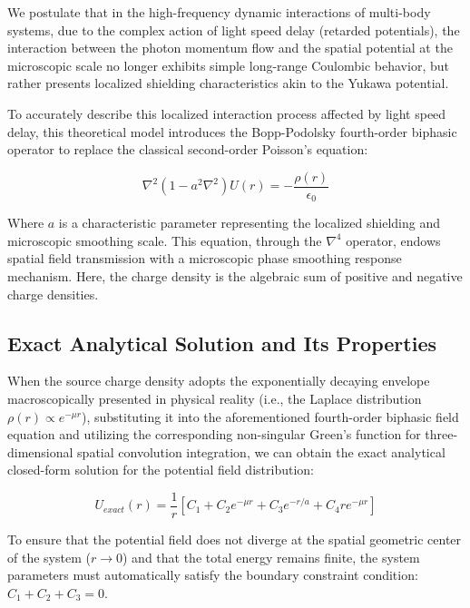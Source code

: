 \documentclass[12pt, a4paper]{article}
\begin{document}
We postulate that in the high-frequency dynamic interactions of multi-body systems, due to the complex action of light speed delay (retarded potentials), the interaction between the photon momentum flow and the spatial potential at the microscopic scale no longer exhibits simple long-range Coulombic behavior, but rather presents localized shielding characteristics akin to the Yukawa potential.

To accurately describe this localized interaction process affected by light speed delay, this theoretical model introduces the Bopp-Podolsky fourth-order biphasic operator to replace the classical second-order Poisson's equation:

\begin{equation}
\nabla^2 (1 - a^2 \nabla^2) U(r) = - \frac{\rho(r)}{\epsilon_0} 
\end{equation}

Where $a$ is a characteristic parameter representing the localized shielding and microscopic smoothing scale. This equation, through the $\nabla^4$ operator, endows spatial field transmission with a microscopic phase smoothing response mechanism. Here, the charge density is the algebraic sum of positive and negative charge densities.

\subsection{Exact Analytical Solution and Its Properties}

When the source charge density adopts the exponentially decaying envelope macroscopically presented in physical reality (i.e., the Laplace distribution $\rho(r) \propto e^{-\mu r}$), substituting it into the aforementioned fourth-order biphasic field equation and utilizing the corresponding non-singular Green's function for three-dimensional spatial convolution integration, we can obtain the exact analytical closed-form solution for the potential field distribution:

\begin{equation}
U_{exact}(r) = \frac{1}{r} \left[ C_1 + C_2 e^{-\mu r} + C_3 e^{-r/a} + C_4 r e^{-\mu r} \right] 
\end{equation}

To ensure that the potential field does not diverge at the spatial geometric center of the system ($r \to 0$) and that the total energy remains finite, the system parameters must automatically satisfy the boundary constraint condition: $C_1 + C_2 + C_3 = 0$.
\end{document}
